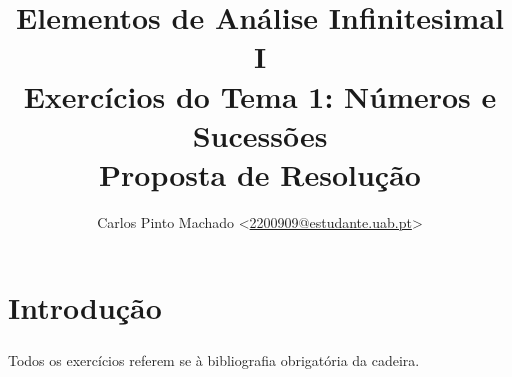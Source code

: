 \documentclass[11pt, a4paper]{report}
\title{
	Elementos de Análise Infinitesimal I\\
	Exercícios do Tema 1: Números e Sucessões\\
	Proposta de Resolução
}
\author{
	Carlos Pinto Machado
	<\href{mailto:2200909@estudante.uab.pt}{2200909@estudante.uab.pt}>
}
\begin{document}
\maketitle
\tableofcontents

\clearpage

\chapter*{Introdução}
{}

\paragraph{} Todos os exercícios referem se à bibliografia obrigatória da
cadeira\parencite{Santos2016}.






\clearpage

\printbibliography[title={Bibliografia},heading=bibintoc]
\end{document}
